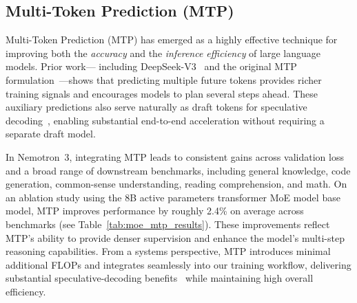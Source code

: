 \documentclass[11pt, logo, onecolumn, copyright, colorlinks=true, allcolors=blue]{nvidiatechreport}
\begin{document}
\subsection{Multi-Token Prediction (MTP)}
\label{subsec:mtp}
Multi-Token Prediction (MTP) has emerged as a highly effective technique for improving both the 
\emph{accuracy} and the \emph{inference efficiency} of large language models. Prior work—
including DeepSeek-V3~\citep{deepseekai2025deepseekv3technicalreport} and the original MTP 
formulation~\citep{gloeckle2024better}—shows that predicting multiple future tokens provides richer 
training signals and encourages models to plan several steps ahead. These auxiliary predictions also 
serve naturally as draft tokens for speculative decoding~\citep{leviathan2023fast}, enabling 
substantial end-to-end acceleration without requiring a separate draft model.

In Nemotron~3, integrating MTP leads to consistent gains across validation loss and a broad range of downstream benchmarks, including general knowledge, code generation, common-sense understanding, reading comprehension, and math. On an ablation study using the 8B active parameters transformer MoE model base model, MTP improves performance by roughly 2.4\% on average across benchmarks (see Table~\ref{tab:moe_mtp_results}). These improvements reflect MTP’s ability to provide denser supervision and enhance the model’s multi-step reasoning capabilities. From a systems perspective, MTP introduces minimal additional FLOPs and integrates seamlessly into our training workflow, delivering substantial speculative-decoding benefits~\citep{gloeckle2024better} while maintaining high overall efficiency.
\end{document}
